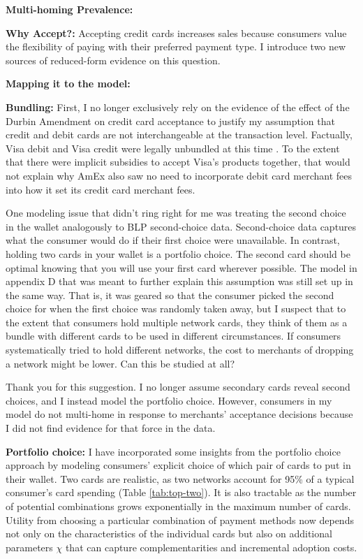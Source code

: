 \documentclass[main.tex]{subfiles}
\begin{document}
\begin{refsection}
\textbf{Multi-homing Prevalence: } \replycreditdebitmulti

\textbf{Why Accept?: } Accepting credit cards increases sales because consumers value the flexibility of paying with their preferred payment type.
I introduce two new sources of reduced-form evidence on this question.
\replywhyacceptcredit

\textbf{Mapping it to the model: } \replycreditdebitmultimodel

\textbf{Bundling: } First, I no longer exclusively rely on the evidence of the effect of the Durbin Amendment on credit card acceptance to justify my assumption that credit and debit cards are not interchangeable at the transaction level.
Factually, Visa debit and Visa credit were legally unbundled at this time \parencite{Constantine2012}.
To the extent that there were implicit subsidies to accept Visa's products together, that would not explain why AmEx also saw no need to incorporate debit card merchant fees into how it set its credit card merchant fees.

\begin{refcomment}
One modeling issue that didn't ring right for me was treating the second choice in the wallet analogously to BLP second-choice data.
Second-choice data captures what the consumer would do if their first choice were unavailable.
In contrast, holding two cards in your wallet is a portfolio choice.
The second card should be optimal knowing that you will use your first card wherever possible.
The model in appendix D that was meant to further explain this assumption was still set up in the same way.
That is, it was geared so that the consumer picked the second choice for when the first choice was randomly taken away, but I suspect that to the extent that consumers hold multiple network cards, they think of them as a bundle with different cards to be used in different circumstances.
If consumers systematically tried to hold different networks, the cost to merchants of dropping a network might be lower.
Can this be studied at all?
\end{refcomment}

Thank you for this suggestion.
I no longer assume secondary cards reveal second choices, and I instead model the portfolio choice.
However, consumers in my model do not multi-home in response to merchants' acceptance decisions because I did not find evidence for that force in the data.

\textbf{Portfolio choice: } I have incorporated some insights from the portfolio choice approach by modeling consumers' explicit choice of which pair of cards to put in their wallet.
Two cards are realistic, as two networks account for 95\% of a typical consumer's card spending (Table \ref{tab:top-two}).
It is also tractable as the number of potential combinations grows exponentially in the maximum number of cards.
Utility from choosing a particular combination of payment methods now depends not only on the characteristics of the individual cards but also on additional parameters $\chi$ that can capture complementarities and incremental adoption costs.


\end{refsection}
\end{document}
